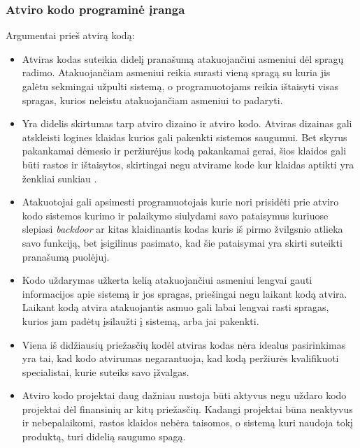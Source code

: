 \documentclass[a4paper,12pt,fleqn]{article}
\begin{document}
\subsubsection{Atviro kodo programinė įranga}
\label{sec:data}
Argumentai prieš atvirą kodą:
\begin{itemize}
	\item Atviras kodas suteikia didelį pranašumą atakuojančiui asmeniui dėl spragų radimo. Atakuojančiam asmeniui reikia surasti vieną spragą su kuria jis galėtu sekmingai užpulti sistemą, o programuotojams reikia ištaisyti visas spragas, kurios neleistu atakuojančiam asmeniui to padaryti\cite{brown2002opening}.
	\item Yra didelis skirtumas tarp atviro dizaino ir atviro kodo. Atviras dizainas gali atskleisti logines klaidas kurios gali pakenkti sistemos saugumui. Bet skyrus pakankamai dėmesio ir peržiurėjus kodą pakankamai gerai, šios klaidos gali būti rastos ir ištaisytos, skirtingai negu atvirame kode kur klaidas aptikti yra ženkliai sunkiau \cite{hoepman2008increased}.
	\item Atakuotojai gali apsimesti programuotojais kurie nori prisidėti prie atviro kodo sistemos kurimo ir palaikymo siulydami savo pataisymus kuriuose slepiasi \textit{backdoor} ar kitas klaidinantis kodas kuris iš pirmo žvilgsnio atlieka savo funkciją, bet įsigilinus pasimato, kad šie pataisymai yra skirti suteikti pranašumą puolėjuj\cite{951496}. 
	\item Kodo uždarymas užkerta kelią atakuojančiui asmeniui lengvai gauti informacijos apie sistemą ir jos spragas, priešingai negu laikant kodą atvira. Laikant kodą atvira atakuojantis asmuo gali labai lengvai rasti spragas, kurios jam padėtų įsilaužti į sistemą, arba jai pakenkti\cite{hoepman2008increased}. 
	\item Viena iš didžiausių priežasčių kodėl atviras kodas nėra idealus pasirinkimas yra tai, kad kodo atvirumas negarantuoja, kad kodą peržiurės kvalifikuoti specialistai, kurie suteiks savo įžvalgas\cite{951496}. 
	\item Atviro kodo projektai daug dažniau nustoja būti aktyvus negu uždaro kodo projektai dėl finansinių ar kitų priežasčių. Kadangi projektai būna neaktyvus ir nebepalaikomi, rastos klaidos nebėra taisomos, o sistemą kuri naudoja tokį produktą, turi didelią saugumo spagą\cite{951496}. 
\end{itemize}
\end{document}
